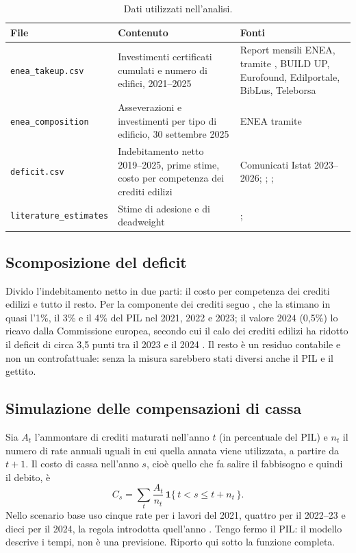 \documentclass[11pt,a4paper]{article}
\begin{document}
\begin{table}[H]\centering\small
\caption{Dati utilizzati nell'analisi.}\label{tab:data}
\begin{tabular}{p{3.6cm}p{5.0cm}p{5.1cm}}
\toprule
File & Contenuto & Fonti \\
\midrule
\texttt{enea\_takeup.csv} & Investimenti certificati cumulati e numero di edifici, 2021--2025 & Report mensili ENEA, tramite \citet{upb2024}, BUILD UP, Eurofound, Edilportale, BibLus, Teleborsa \\
\texttt{enea\_composition} & Asseverazioni e investimenti per tipo di edificio, 30 settembre 2025 & ENEA tramite \citet{edilportale2025} \\
\texttt{deficit.csv} & Indebitamento netto 2019--2025, prime stime, costo per competenza dei crediti edilizi & Comunicati Istat 2023--2026; \citet{agi2023}; \citet{corsello2025}; \citet{ec2025} \\
\texttt{literature\_estimates} & Stime di adesione e di deadweight & \citet{accetturo2026}; \citet{mef_wp} \\
\bottomrule
\end{tabular}
\end{table}

\subsection{Scomposizione del deficit}
Divido l'indebitamento netto in due parti: il costo per competenza dei crediti edilizi e tutto il resto. Per la componente dei crediti seguo \citet{corsello2025}, che la stimano in quasi l'1\%, il 3\% e il 4\% del PIL nel 2021, 2022 e 2023; il valore 2024 (0,5\%) lo ricavo dalla Commissione europea, secondo cui il calo dei crediti edilizi ha ridotto il deficit di circa 3,5 punti tra il 2023 e il 2024 \citep{ec2025}. Il resto è un residuo contabile e non un controfattuale: senza la misura sarebbero stati diversi anche il PIL e il gettito.

\subsection{Simulazione delle compensazioni di cassa}
Sia $A_t$ l'ammontare di crediti maturati nell'anno $t$ (in percentuale del PIL) e $n_t$ il numero di rate annuali uguali in cui quella annata viene utilizzata, a partire da $t+1$. Il costo di cassa nell'anno $s$, cioè quello che fa salire il fabbisogno e quindi il debito, è
\begin{equation}
C_s=\sum_{t}\frac{A_t}{n_t}\,\mathbf{1}\{\,t< s\le t+n_t\,\}.
\end{equation}
Nello scenario base uso cinque rate per i lavori del 2021, quattro per il 2022--23 e dieci per il 2024, la regola introdotta quell'anno \citep{imf2024}. Tengo fermo il PIL: il modello descrive i tempi, non è una previsione. Riporto qui sotto la funzione completa.
\end{document}
